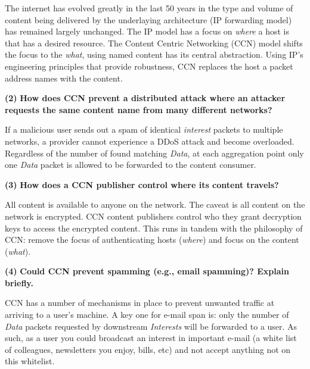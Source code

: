 \documentclass[11pt]{article}
\renewcommand\part[1]{\vspace{.10in}\textbf{(#1)}}
\begin{document}
The internet has evolved greatly in the last 50 years in the type and volume of content being delivered by the underlaying architecture (IP forwarding model) has remained largely unchanged. The IP model has a focus on \textit{where} a host is that has a desired resource. The Content Centric Networking (CCN) model shifts the focus to the \textit{what}, using named content has its central abstraction. Using IP's engineering principles that provide robustness, CCN replaces the host a packet address names with the content.

\part{2} \textbf{How does CCN prevent a distributed attack where an attacker requests the same content name from many different networks?} \newline

If a malicious user sends out a spam of identical \textit{interest} packets to multiple networks, a provider cannot experience a DDoS attack and become overloaded. Regardless of the number of found matching \textit{Data}, at each aggregation point only one \textit{Data} packet is allowed to be forwarded to the content consumer.

\part{3} \textbf{How does a CCN publisher control where its content travels?}

All content is available to anyone on the network. The caveat is all content on the network is encrypted. CCN content publishers control who they grant decryption keys to access the encrypted content. This runs in tandem with the philosophy of CCN: remove the focus of authenticating hosts (\textit{where}) and focus on the content (\textit{what}).

\part{4} \textbf{Could CCN prevent spamming (e.g., email spamming)? Explain briefly.}

CCN has a number of mechanisms in place to prevent unwanted traffic at arriving to a user's machine. A key one for e-mail span is: only the number of \textit{Data} packets requested by downstream \textit{Interests} will be forwarded to a user. As such, as a user you could broadcast an interest in important e-mail (a white list of colleagues, newsletters you enjoy, bills, etc) and not accept anything not on this whitelist.
\end{document}
